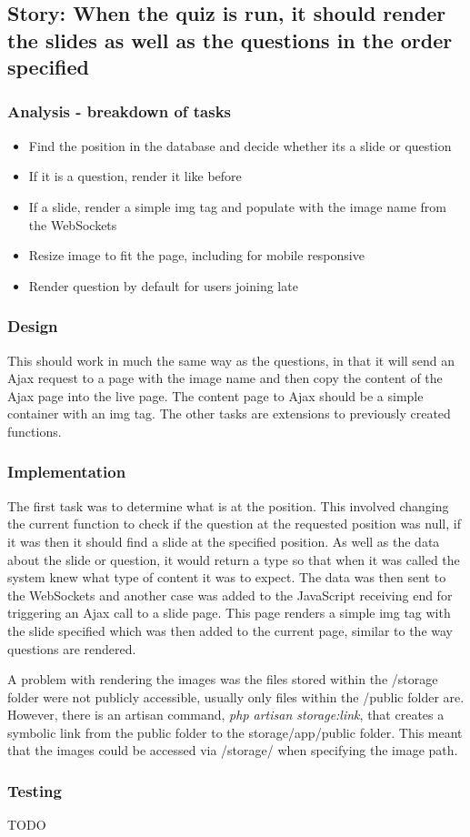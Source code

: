 \subsection{Story: When the quiz is run, it should render the slides as well as the questions in the order specified}
\subsubsection{Analysis - breakdown of tasks}
\begin{itemize}
	\item Find the position in the database and decide whether its a slide or question
	\item If it is a question, render it like before
	\item If a slide, render a simple img tag and populate with the image name from the WebSockets
	\item Resize image to fit the page, including for mobile responsive
	\item Render question by default for users joining late
\end{itemize}
\subsubsection{Design}
This should work in much the same way as the questions, in that it will send an Ajax request to a page with the image name and then copy the content of the Ajax page into the live page. The content page to Ajax should be a simple container with an img tag. The other tasks are extensions to previously created functions.
\subsubsection{Implementation}
The first task was to determine what is at the position. This involved changing the current function to check if the question at the requested position was null, if it was then it should find a slide at the specified position. As well as the data about the slide or question, it would return a type so that when it was called the system knew what type of content it was to expect. The data was then sent to the WebSockets and another case was added to the JavaScript receiving end for triggering an Ajax call to a slide page. This page renders a simple img tag with the slide specified which was then added to the current page, similar to the way questions are rendered.

A problem with rendering the images was the files stored within the /storage folder were not publicly accessible, usually only files within the /public folder are. However, there is an artisan command, \textit{php artisan storage:link}, that creates a symbolic link from the public folder to the storage/app/public folder. This meant that the images could be accessed via /storage/ when specifying the image path.
\subsubsection{Testing}
TODO
\newpage